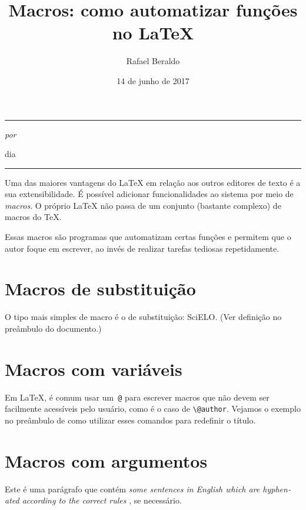 \documentclass[a4paper]{article}
\title{Macros: como automatizar funções no \LaTeX}
\author{Rafael Beraldo}
\date{14 de junho de 2017}
\makeatletter
\newcommand{\scielo}{SciELO\xspace}
\newcommand{\eng}[1]{%
  \emph{\textenglish{#1}}%
}
\renewcommand{\maketitle}{
  \begin{flushleft}
    \sffamily
    {\rule{\linewidth}{1pt}}
    {\Large\bfseries\@title\par}
    \medskip
    {\color{darkgray}\large\itshape por \@author{}\par
    dia \@date \par}
    {\rule{\linewidth}{1pt}}
    \bigskip
  \end{flushleft}
}
\makeatother
\begin{document}
\frenchspacing

\maketitle

Uma das maiores vantagens do \LaTeX{} em relação aos outros editores de texto é
a sua extensibilidade. É possível adicionar funcionalidades ao sistema por meio
de \emph{macros}. O próprio \LaTeX{} não passa de um conjunto (bastante
complexo) de macros do \TeX.

Essas macros são programas que automatizam certas funções e permitem que o
autor foque em escrever, ao invés de realizar tarefas tediosas repetidamente.

\section{Macros de substituição}

O tipo mais simples de macro é o de substituição: \scielo. (Ver definição
no preâmbulo do documento.)

\section{Macros com variáveis}

Em \LaTeX, é comum usar um~\verb+@+ para escrever macros que não devem ser
facilmente acessíveis pelo usuário, como é o caso de \verb+\@author+. Vejamos o
exemplo no preâmbulo de como utilizar esses comandos para redefinir o título.

\section{Macros com argumentos}

Este é uma parágrafo que contém \eng{some sentences in English which are
hyphenated according to the correct rules}, se necessário.
\end{document}
